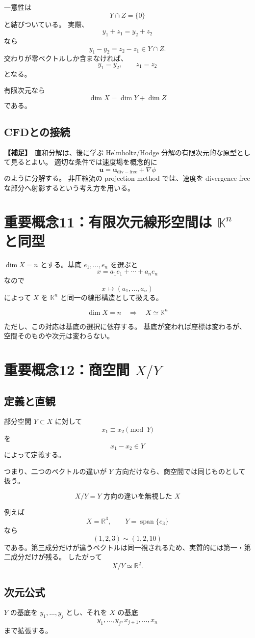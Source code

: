 \documentclass[a4paper,11pt]{ltjsarticle}
\newcommand{\R}{\mathbb{R}}
\newcommand{\K}{\mathbb{K}}
\newcommand{\Span}{\operatorname{span}}
\newcommand{\suppitem}{\textbf{【補足】}}
\begin{document}
一意性は
\[
Y\cap Z=\{0\}
\]
と結びついている。
実際、
\[
y_1+z_1=y_2+z_2
\]
なら
\[
y_1-y_2=z_2-z_1\in Y\cap Z.
\]
交わりが零ベクトルしか含まなければ、
\[
y_1=y_2,\qquad z_1=z_2
\]
となる。

有限次元なら
\[
\boxed{\dim X=\dim Y+\dim Z}
\]
である。

\subsection{CFDとの接続}
\suppitem\ 直和分解は、後に学ぶ Helmholtz/Hodge 分解の有限次元的な原型として見るとよい。
適切な条件では速度場を概念的に
\[
\bm{u}=\bm{u}_{\mathrm{div-free}}+\nabla\phi
\]
のように分解する。
非圧縮流の projection method では、速度を divergence-free な部分へ射影するという考え方を用いる。

\section{重要概念11：有限次元線形空間は $\K^n$ と同型}

$\dim X=n$ とする。基底 $e_1,\dots,e_n$ を選ぶと
\[
x=a_1e_1+\cdots+a_ne_n
\]
なので
\[
x\longmapsto (a_1,\dots,a_n)
\]
によって $X$ を $\K^n$ と同一の線形構造として扱える。

\[
\boxed{\dim X=n\quad\Longrightarrow\quad X\simeq\K^n}
\]

ただし、この対応は基底の選択に依存する。
基底が変われば座標は変わるが、空間そのものや次元は変わらない。

\section{重要概念12：商空間 $X/Y$}

\subsection{定義と直観}
部分空間 $Y\subset X$ に対して
\[
x_1\equiv x_2\pmod{Y}
\]
を
\[
x_1-x_2\in Y
\]
によって定義する。

つまり、二つのベクトルの違いが $Y$ 方向だけなら、商空間では同じものとして扱う。

\[
\boxed{X/Y=\text{$Y$ 方向の違いを無視した $X$}}
\]

例えば
\[
X=\R^3,\qquad Y=\Span\{e_3\}
\]
なら
\[
(1,2,3)\sim(1,2,10)
\]
である。第三成分だけが違うベクトルは同一視されるため、実質的には第一・第二成分だけが残る。
したがって
\[
X/Y\simeq\R^2.
\]

\subsection{次元公式}
$Y$ の基底を $y_1,\dots,y_j$ とし、それを $X$ の基底
\[
y_1,\dots,y_j,x_{j+1},\dots,x_n
\]
まで拡張する。
\end{document}
